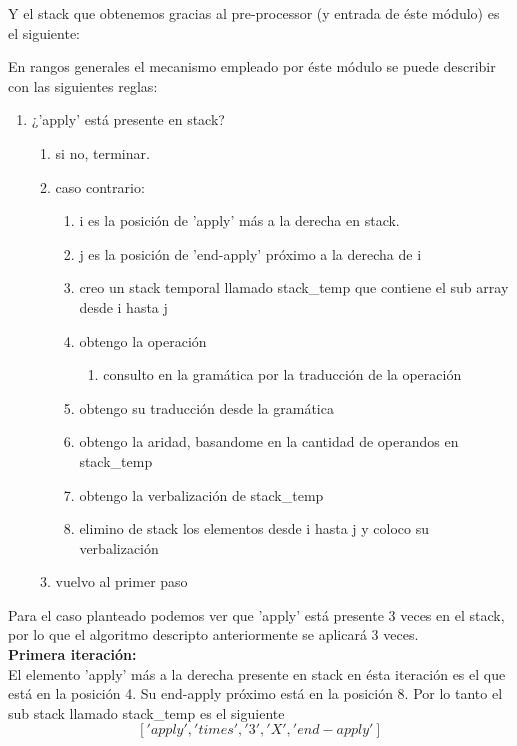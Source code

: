Y el stack que obtenemos gracias al pre-processor (y entrada de éste módulo) es el siguiente:\\

En rangos generales el mecanismo empleado por éste módulo se puede describir con las siguientes reglas:

\begin{enumerate}
\item ¿'apply' está presente en stack?
\begin{enumerate}
	\item si no, terminar.
	\item caso contrario:
	\begin{enumerate}
		\item i es la posición de 'apply' más a la derecha en stack.
		\item j es la posición de 'end-apply' próximo a la derecha de i
		\item creo un stack temporal llamado stack\_temp que contiene el sub array desde i hasta j
		\item obtengo la operación
		\begin{enumerate}
			\item consulto en la gramática por la traducción de la operación
		\end{enumerate}
		\item obtengo su traducción desde la gramática
		\item obtengo la aridad, basandome en la cantidad de operandos en stack\_temp
		\item obtengo la verbalización de stack\_temp
		\item elimino de stack los elementos desde i hasta j y coloco su verbalización
	\end{enumerate}
	\item vuelvo al primer paso
\end{enumerate}
\end{enumerate}

Para el caso planteado podemos ver que 'apply' está presente 3 veces en el stack, por lo que el algoritmo descripto anteriormente se aplicará 3 veces.\\

{\Large \textbf{Primera iteración:}}\\
El elemento 'apply' más a la derecha presente en stack en ésta iteración es el que está en la posición 4. Su end-apply próximo está en la posición 8. Por lo tanto el sub stack llamado stack\_temp es el siguiente
$$['apply', 'times', '3', 'X', 'end-apply']$$

